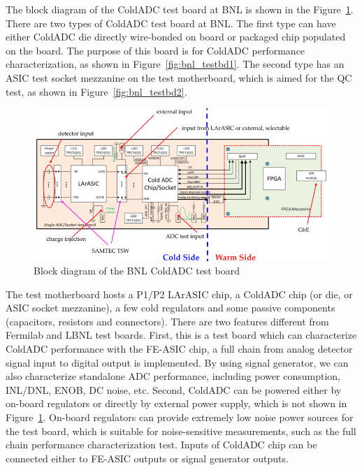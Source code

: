 \label{sec:2.2}

 The block diagram of the ColdADC test board at BNL is shown in the Figure~\ref{fig:bnl_testsyst}. There are two types of ColdADC test board at BNL. The first type can have either ColdADC die directly wire-bonded on board or packaged chip populated on the board. The purpose of this board is for ColdADC performance characterization, as shown in Figure~\ref{fig:bnl_testbd1}.  The second type has an ASIC test socket mezzanine on the test motherboard, which is aimed for the QC test, as shown in Figure~\ref{fig:bnl_testbd2}. 
\begin{figure}[!ht]
\centering
 \includegraphics[width=0.85\linewidth]{figures/BNL_testsystem.png}
  \caption{Block diagram of the BNL ColdADC test board}
  \label{fig:bnl_testsyst}
\end{figure}

The test motherboard hosts a P1/P2 LArASIC chip, a ColdADC chip (or die, or ASIC socket mezzanine), a few cold regulators and some passive components (capacitors, resistors and connectors). There are two features different from Fermilab and LBNL test boards. First, this is a test board which can characterize ColdADC performance with the FE-ASIC chip, a full chain from analog detector signal input to digital output is implemented. By using signal generator, we can also characterize standalone ADC performance, including power consumption, INL/DNL, ENOB, DC noise, etc. Second, ColdADC can be powered either by on-board regulators or directly by external power supply, which is not shown in Figure~\ref{fig:bnl_testsyst}. On-board regulators can provide extremely low noise power sources for the test board, which is suitable for noise-sensitive measurements, such as the full chain performance characterization test. Inputs of ColdADC chip can be connected either to FE-ASIC outputs or signal generator outputs.  

